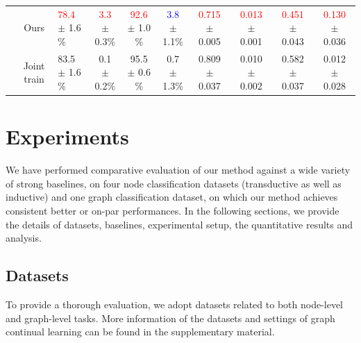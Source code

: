 \documentclass[letterpaper]{article} %
\begin{document}
\begin{table}[]
{\begin{tabular}{c|c|lc|cc|cc|cc}
                                                                       & Ours                     & \textcolor{red}{78.4} $\pm$ 1.6$\%$ & \textcolor{red}{3.3} $\pm$ 0.3$\%$ & \textcolor{red}{92.6} $\pm$ 1.0$\%$ & \textcolor{blue}{3.8} $\pm$ 1.1$\%$ & \textcolor{red}{0.715} $\pm$ 0.005 & \textcolor{red}{0.013} $\pm$ 0.001 & \textcolor{red}{0.451} $\pm$ 0.043    & \textcolor{red}{0.130} $\pm$ 0.036 \\ %
                                                                       & Joint train              & 83.5 $\pm$ 1.6$\%$ & 0.1 $\pm$ 0.2$\%$                           & 95.5 $\pm$ 0.6$\%$                           & 0.7 $\pm$ 1.3$\%$                          & 0.809 $\pm$ 0.037                           & 0.010 $\pm$ 0.002                         & 0.582 $\pm$ 0.037    & 0.012 $\pm$ 0.028                           \\ \bottomrule
\end{tabular}%
}
\label{result}
\end{table}




\section{Experiments}
We have performed comparative evaluation of our method against a wide variety of strong baselines, on four node classification datasets (transductive as well as inductive) and one graph classification dataset,
on which our method achieves
{consistent better or on-par} performances.
In the following sections, we provide the details of datasets, baselines, experimental setup, the quantitative results and analysis.

\subsection{Datasets}
To provide a thorough evaluation,
we adopt datasets related to both
node-level and graph-level tasks.
More information of the datasets and settings of graph continual learning
can be found in the supplementary material.
\end{document}

